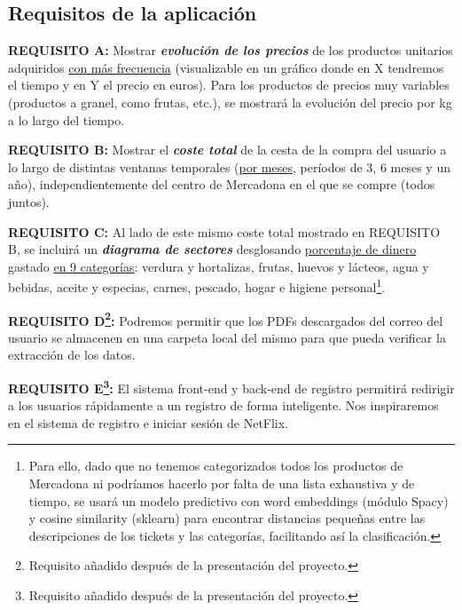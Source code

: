 \documentclass[a4paper,12pt]{report}
\begin{document}
		
			\subsection{Requisitos de la aplicación}
			\label{sec:requisitosAplicacion}
			
		

			

			
		
			
			\textbf{REQUISITO A:} Mostrar\textbf{ \textit{evolución de los precios}} de los productos unitarios adquiridos \underline{con más frecuencia} (visualizable en un gráfico donde en X tendremos el tiempo y en Y el precio en euros). Para los productos de precios muy variables (productos a granel, como frutas, etc.), se mostrará la evolución del precio por kg a lo largo del tiempo.
			
			\textbf{REQUISITO B:} Mostrar el \textbf{\textit{coste total}} de la cesta de la compra del usuario a lo largo de distintas ventanas temporales (\underline{por meses}, períodos de 3, 6 meses y un año), independientemente del centro de Mercadona en el que se compre (todos juntos).
			
			\textbf{REQUISITO C:} Al lado de este mismo coste total mostrado en REQUISITO B, se incluirá un \textbf{\textit{diagrama de sectores}} desglosando \underline{porcentaje de dinero} gastado \underline{en 9 categorías}: verdura y hortalizas, frutas, huevos y lácteos, agua y bebidas, aceite y especias, carnes, pescado, hogar e higiene personal\footnote{Para ello, dado que no tenemos categorizados todos los productos de Mercadona ni podríamos hacerlo por falta de una lista exhaustiva y de tiempo, se usará un modelo predictivo con word embeddings (módulo Spacy) y cosine similarity (sklearn) para encontrar distancias pequeñas entre las descripciones de los tickets y las categorías, facilitando así la clasificación.}.
			
			
			\textbf{REQUISITO D\footnote{Requisito añadido después de la presentación del proyecto.}:} Podremos permitir que los PDFs descargados del correo del usuario se almacenen en una carpeta local del mismo para que pueda verificar la extracción de los datos.
			
			\textbf{REQUISITO E\footnote{Requisito añadido después de la presentación del proyecto.}:} El sistema front-end y back-end de registro permitirá redirigir a los usuarios rápidamente a un registro de forma inteligente. Nos inspiraremos en el sistema de registro e iniciar sesión de NetFlix.
			
\end{document}
